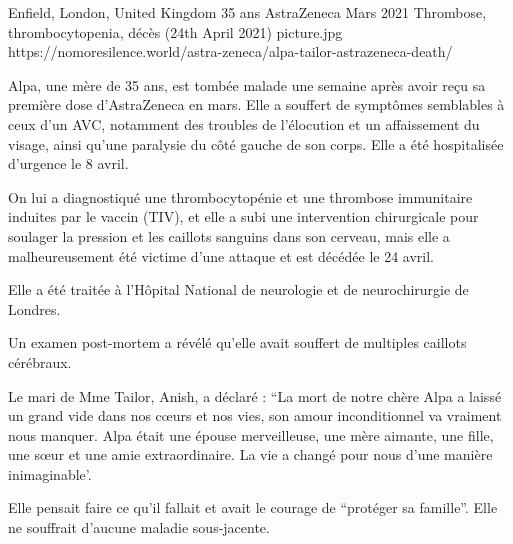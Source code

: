 {Enfield, London, United Kingdom}
{35 ans}
{AstraZeneca}
{Mars 2021}
{Thrombose, thrombocytopenia, décès (24th April 2021)}
{picture.jpg}
{https://nomoresilence.world/astra-zeneca/alpa-tailor-astrazeneca-death/}
{

Alpa, une mère de 35 ans, est tombée malade une semaine après avoir reçu sa
première dose d'AstraZeneca en mars. Elle a souffert de symptômes semblables à
ceux d'un AVC, notamment des troubles de l'élocution et un affaissement du
visage, ainsi qu'une paralysie du côté gauche de son corps. Elle a été
hospitalisée d'urgence le 8 avril.

On lui a diagnostiqué une thrombocytopénie et une thrombose immunitaire induites
par le vaccin (TIV), et elle a subi une intervention chirurgicale pour soulager
la pression et les caillots sanguins dans son cerveau, mais elle a
malheureusement été victime d'une attaque et est décédée le 24 avril.

Elle a été traitée à l'Hôpital National de neurologie et de neurochirurgie de
Londres.

Un examen post-mortem a révélé qu'elle avait souffert de multiples caillots
cérébraux.

Le mari de Mme Tailor, Anish, a déclaré : “La mort de notre chère Alpa a laissé
un grand vide dans nos cœurs et nos vies, son amour inconditionnel va vraiment
nous manquer. Alpa était une épouse merveilleuse, une mère aimante, une fille,
une sœur et une amie extraordinaire. La vie a changé pour nous d'une manière
inimaginable'.

Elle pensait faire ce qu'il fallait et avait le courage de “protéger sa
famille”. Elle ne souffrait d'aucune maladie sous-jacente.

}
